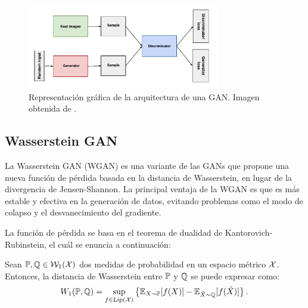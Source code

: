\begin{figure}[H]
    \centering
    \includegraphics[width=0.75\textwidth]{img/gan/gan_diagram.pdf}
    \caption{Representación gráfica de la arquitectura de una GAN. Imagen obtenida de \cite{googlegan}.}
    \label{fig:gan-diagram}
\end{figure}






\subsection{Wasserstein GAN}\label{ssec:wasserstein-gan}  %

La Wasserstein GAN (WGAN) \cite{arjovsky2017wasserstein} es una variante de las GANs que propone una nueva función de pérdida basada en la distancia de Wasserstein, en lugar de la divergencia de Jensen-Shannon. La principal ventaja de la WGAN es que es más estable y efectiva en la generación de datos, evitando problemas como el modo de colapso y el desvanecimiento del gradiente.

La función de pérdida se basa en el teorema de dualidad de Kantorovich-Rubinstein, el cuál se enuncia a continuación:
\begin{theorem}\label{thm:dualidad-kantorovich-rubinstein}
    Sean $\Prob, \ProbQ \in \WassersteinSpace[1]{\cX}$ dos medidas de probabilidad en un espacio métrico $\mathcal{X}$. Entonces, la distancia de Wasserstein entre $\Prob$ y $\ProbQ$ se puede expresar como:
    \begin{equation}\label{eq:dualidad-kantorovich-rubinstein}
        \Wasserstein[1]{\Prob}{\ProbQ} = \sup_{f \in \Lip[\cX]} \left\{ \Exp_{X\sim \Prob} [f(X)] - \Exp_{\tilde X \sim \ProbQ} [f(\tilde X)] \right\}.
    \end{equation}
\end{theorem}

